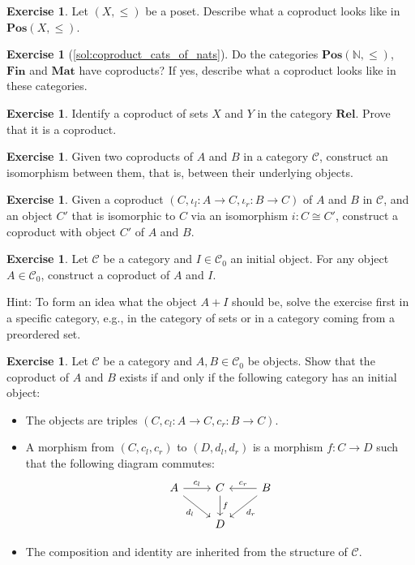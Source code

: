 \documentclass[a4paper,11pt, oneside,titlepage=false]{scrbook}
\theoremstyle{plain}
\theoremstyle{definition}
\newtheorem{exer}[thm]{Exercise}
\newcommand{\Cat}[1]{\mathcal{#1}}
\newcommand{\CC}{\Cat{C}}
\newcommand{\Catb}[1]{\mathbf{#1}}
\newcommand{\POS}{\Catb{Pos}}
\newcommand{\MAT}{\Catb{Mat}}
\newcommand{\SKELFINSET}{\Catb{Fin}}
\newcommand{\REL}{\Catb{Rel}}
\newcommand{\Ob}[1]{{#1}_0}
\newcommand{\inl}{\ensuremath{\iota_l}}
\newcommand{\inr}{\ensuremath{\iota_r}}
\newcommand{\NN}{\ensuremath{\mathbb{N}}}
\begin{document}
\begin{exer}\label{exer:coproduct_posetcat}
  Let $(X,\leq)$ be a poset. Describe what a coproduct looks like in  $\POS(X,\leq)$.
\end{exer}

\begin{exer}[\cref{sol:coproduct_cats_of_nats}]\label{exer:coproduct_cats_of_nats}
  Do the categories $\POS(\NN, \leq)$, $\SKELFINSET$ and $\MAT$ have coproducts? If yes, describe what a coproduct looks like in these categories.
\end{exer}

\begin{exer}\label{exer:coproduct_rel}
  Identify a coproduct of sets $X$ and $Y$ in the category $\REL$. Prove that it is a coproduct.
\end{exer}

\begin{exer}\label{exer:coproduct-unique}
  Given two coproducts of $A$ and $B$ in a category $\CC$, construct an isomorphism between them, that is, between their underlying objects.
\end{exer}

\begin{exer}\label{exer:coproduct_preserved_by_iso}
  Given a coproduct $(C,\inl : A \to C ,\inr : B \to C)$ of $A$ and $B$ in $\CC$, and an object $C'$ that is isomorphic to $C$ via an isomorphism $i : C \cong C'$, construct a coproduct with object $C'$ of $A$ and $B$.
\end{exer}

\begin{exer}\label{exer:coproduct_with_initial} Let $\CC$ be a category and $I\in\Ob{\CC}$ an initial object.
  For any object $A\in \Ob{\CC}$, construct a coproduct of $A$ and $I$.

  Hint: To form an idea what the object $A + I$ should be, solve the exercise first in a specific category, e.g., in the category of sets or in a category coming from a preordered set.
\end{exer}

\begin{exer}\label{exer:coproduct_iff_initial_in_subcategory} Let $\CC$ be a category and $A,B\in\Ob{\CC}$ be objects. Show that the coproduct of $A$ and $B$ exists if and only if the following category has an initial object:
\begin{itemize}
\item The objects are triples $(C,c_l: A\to C, c_r:B\to C)$.
\item A morphism from $(C,c_l,c_r)$ to $(D,d_l,d_r)$ is a morphism $f : C \to D$ such that the following diagram commutes:
\[
    \begin{tikzcd}
      A \ar[r, "c_l"] \ar[rd, "d_l"']
      &
      C  \ar[d, "f"]
      &
      B \ar[l, "c_r"'] \ar[ld, "d_r"]
      \\
      &
      D
    \end{tikzcd}
  \]
\item The composition and identity are inherited from the structure of $\CC$.
\end{itemize}
\end{exer}
\end{document}

